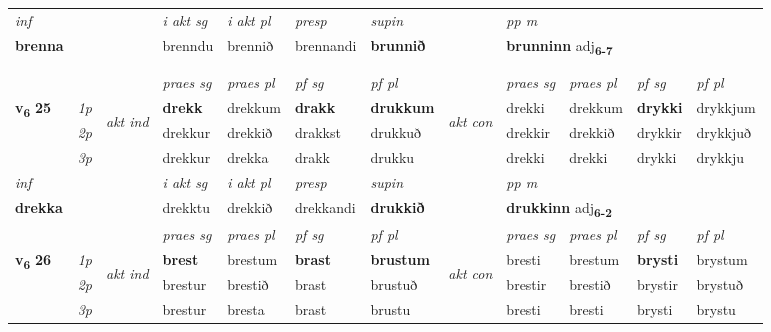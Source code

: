 \begin{longtable}[l]{X>{\footnotesize\itshape}llXXXXlXXXX}
   {\textit{inf}} & &  & \textit{i akt sg} & \textit{i akt pl}   & \textit{presp} & \textit{supin}  && \textit{pp m} \\*
  {\textbf{brenna}} & && brenndu  & brennið   & brennandi &  \textbf{brunnið}  && \multicolumn{2}{l}{\textbf{brunninn} adj\textbf{\textsubscript{6-7}}} \\*

\midrule
  & \\*
  & \\
   \midrule
 & &   & \textit{praes sg}  & \textit{praes pl}    & \textit{ pf sg} & \textit{pf pl} & & \textit{praes sg}  & \textit{praes pl}    & \textit{pf sg} & \textit{pf pl }  \\ \cmidrule{4-7} \cmidrule{9-12}
 \multirow{2}{*}{{{\textbf{v{\textsubscript{6}}} \Large{\textbf{25}}}}}  & 1p & \multirow{3}{*}{\begin{turn}{90}\textit{akt ind}\end{turn}} & \textbf{drekk} & drekkum & \textbf{drakk} & \textbf{drukkum} & \multirow{3}{*}{\begin{turn}{90}\textit{akt con}\end{turn}} &drekki & drekkum & \textbf{drykki} & drykkjum\\*
 & 2p &  &  drekkur  & drekkið & drakkst & drukkuð & & drekkir & drekkið & drykkir & drykkjuð \\*
 & 3p &  & drekkur & drekka & drakk & drukku & & drekki & drekki& drykki & drykkju \\*
\cmidrule{4-7} \cmidrule{9-12}

   {\textit{inf}} & &  & \textit{i akt sg} & \textit{i akt pl}   & \textit{presp} & \textit{supin}  && \textit{pp m} \\*
  {\textbf{drekka}} & && drekktu  & drekkið   & drekkandi &  \textbf{drukkið}  && \multicolumn{2}{l}{\textbf{drukkinn} adj\textbf{\textsubscript{6-2}}} \\*

\midrule

 & &   & \textit{praes sg}  & \textit{praes pl}    & \textit{ pf sg} & \textit{pf pl} & & \textit{praes sg}  & \textit{praes pl}    & \textit{pf sg} & \textit{pf pl }  \\ \cmidrule{4-7} \cmidrule{9-12}
 \multirow{2}{*}{{{\textbf{v{\textsubscript{6}}} \Large{\textbf{26}}}}}  & 1p & \multirow{3}{*}{\begin{turn}{90}\textit{akt ind}\end{turn}} & \textbf{brest} & brestum & \textbf{brast} & \textbf{brustum} & \multirow{3}{*}{\begin{turn}{90}\textit{akt con}\end{turn}} &bresti & brestum & \textbf{brysti} & brystum\\*
 & 2p &  &  brestur  & brestið & brast & brustuð & & brestir & brestið & brystir & brystuð \\*
 & 3p &  & brestur & bresta & brast & brustu & & bresti & bresti& brysti & brystu \\*
\cmidrule{4-7} \cmidrule{9-12}


\end{longtable}
